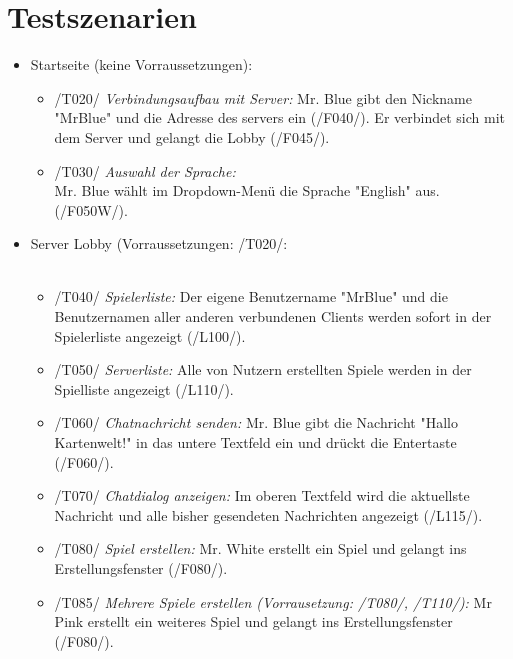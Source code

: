 \documentclass{article}
\begin{document}
\section{Testszenarien}
\begin{itemize}
	\item Startseite (keine Vorraussetzungen): \\
	\begin{itemize}
	
		\item /T020/ \textit{Verbindungsaufbau mit Server:} Mr. Blue gibt den Nickname "MrBlue" und die Adresse des servers ein (/F040/). Er verbindet sich mit dem Server und gelangt die Lobby (/F045/). 
		
		\item /T030/ \textit{Auswahl der Sprache:} \\ Mr. Blue wählt im Dropdown-Menü die Sprache "English" aus. (/F050W/).
			  
			  
	\end{itemize}

	\item Server Lobby (Vorraussetzungen: /T020/: \\ \\
	\begin{itemize}
	
		\item /T040/ \textit{Spielerliste:} Der eigene Benutzername "MrBlue" und die Benutzernamen aller anderen verbundenen Clients werden sofort in der Spielerliste angezeigt (/L100/).
		
		\item /T050/ \textit{Serverliste:} Alle von Nutzern erstellten Spiele werden in der Spielliste angezeigt (/L110/).
	
		\item /T060/ \textit{Chatnachricht senden:} Mr. Blue gibt die Nachricht "Hallo Kartenwelt!" in das untere Textfeld ein und drückt die Entertaste (/F060/).
		
		\item /T070/ \textit{Chatdialog anzeigen:} Im oberen Textfeld wird die aktuellste Nachricht und alle bisher gesendeten Nachrichten angezeigt (/L115/).
		
		\item /T080/ \textit{Spiel erstellen:} Mr. White erstellt ein Spiel und gelangt ins Erstellungsfenster (/F080/).
		
		\item /T085/ \textit{Mehrere Spiele erstellen (Vorrausetzung: /T080/, /T110/):} Mr Pink erstellt ein weiteres Spiel und gelangt ins Erstellungsfenster (/F080/).
		

\end{itemize}
\end{itemize}
\end{document}
